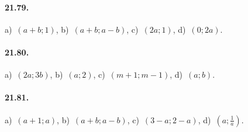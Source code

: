\paragraph{21.79.} a)~$(a+b;1)$, \quad b)~$(a+b;a-b)$, \quad c)~$(2a;1)$, \quad d)~$(0;2a)$.

\paragraph{21.80.} a)~$(2a;3b)$, \quad b)~$(a;2)$, \quad c)~$(m+1;m-1)$, \quad d)~$(a;b)$.

\paragraph{21.81.} a)~$(a+1;a)$, \quad b)~$(a+b;a-b)$, \quad c)~$(3-a;2-a)$, \quad d)~$\left(a;\frac{1}{a}\right)$.

